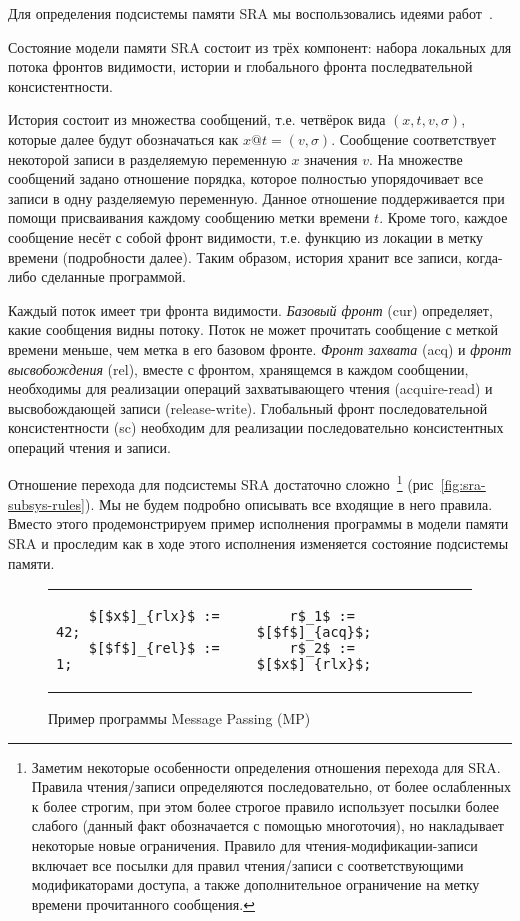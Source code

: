 Для определения подсистемы памяти SRA
мы воспользовались идеями работ~\cite{lahav2016taming, kang2017promising, podkopaev2016operational}.

Состояние модели памяти SRA состоит из трёх компонент:
набора локальных для потока фронтов видимости, истории
и глобального фронта последвательной консистентности.

История состоит из множества сообщений, 
т.е. четвёрок вида $(x, t, v, \sigma)$,
которые далее будут обозначаться как $x@t=(v, \sigma)$.
Сообщение соответствует некоторой записи в разделяемую переменную $x$ значения $v$.
На множестве сообщений задано отношение порядка,
которое полностью упорядочивает все записи в одну разделяемую переменную.
Данное отношение поддерживается при помощи присваивания 
каждому сообщению метки времени $t$.
Кроме того, каждое сообщение несёт с собой фронт видимости,
т.е. функцию из локации в метку времени (подробности далее).
Таким образом, история хранит все записи, когда-либо сделанные программой.

Каждый поток имеет три фронта видимости.
\emph{Базовый фронт} (cur) определяет, какие сообщения видны потоку.
Поток не может прочитать сообщение с меткой времени меньше, 
чем метка в его базовом фронте.
\emph{Фронт захвата} (acq) и \emph{фронт высвобождения} (rel),
вместе с фронтом, хранящемся в каждом сообщении,
необходимы для реализации операций захватывающего чтения (acquire-read) 
и высвобождающей записи (release-write).
Глобальный фронт последовательной консистентности (sc)
необходим для реализации последовательно консистентных операций чтения и записи.

Отношение перехода для подсистемы SRA достаточно сложно~\footnote{
  Заметим некоторые особенности определения отношения перехода для SRA.
  Правила чтения/записи определяются последовательно, от более ослабленных к более 
  строгим, при этом более строгое правило использует посылки более слабого
  (данный факт обозначается с помощью многоточия), но накладывает некоторые новые ограничения.
  Правило для чтения-модификации-записи включает все посылки 
  для правил чтения/записи с соответствующими модификаторами доступа, 
  а также дополнительное ограничение на метку времени прочитанного сообщения.
}
(рис~\ref{fig:sra-subsys-rules}).
Мы не будем подробно описывать все входящие в него правила.
Вместо этого продемонстрируем пример исполнения программы в модели памяти SRA
и проследим как в ходе этого исполнения изменяется состояние подсистемы памяти.

\begin{figure}[htp]
\centering
    \begin{tabular}{l|@{\hskip 5pt}|@{\hskip -15pt}l}
    \begin{lstlisting}
    $[$x$]_{rlx}$ := 42;
    $[$f$]_{rel}$ := 1;
    \end{lstlisting}
    &
    \begin{lstlisting}
    r$_1$ := $[$f$]_{acq}$;
    r$_2$ := $[$x$]_{rlx}$;
    \end{lstlisting}
    \\
    \end{tabular}
    \caption{Пример программы Message Passing (MP)}
    \label{lst:mp-ex-2}
\end{figure}

